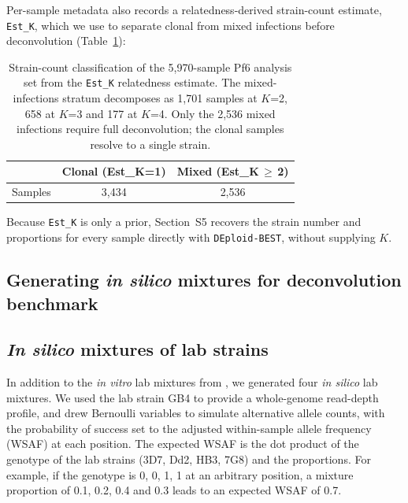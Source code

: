 \documentclass{article}
\begin{document}
Per-sample metadata also records a relatedness-derived strain-count estimate,
\texttt{Est\_K}, which we use to separate clonal from mixed infections before
deconvolution (Table~\ref{tab:pf6}):

\begin{table}[h]
    \centering
    \begin{tabular}{lcc}\hline\hline
                  &  Clonal (Est\_K=1)  & Mixed (Est\_K\,$\geq$\,2) \\ \hline
    Samples &  3,434  & 2,536\\
    \hline\hline
    \end{tabular}
    \caption{Strain-count classification of the 5,970-sample Pf6 analysis set
    from the \texttt{Est\_K} relatedness estimate. The mixed-infections
    stratum decomposes as 1,701 samples at $K$=2, 658 at $K$=3 and 177 at
    $K$=4. Only the 2,536 mixed infections require full deconvolution; the
    clonal samples resolve to a single strain.}
    \label{tab:pf6}
\end{table}

\noindent Because \texttt{Est\_K} is only a prior, Section~S5 recovers the
strain number and proportions for every sample directly with
\texttt{DEploid-BEST}, without supplying $K$.

\subsection{Generating {\it in silico} mixtures for deconvolution benchmark}
\subsection{{\it In silico} mixtures of lab strains}
In addition to the {\it in vitro} lab mixtures from \citet{Wendler2015}, we generated four {\it in silico} lab mixtures. We used the lab strain GB4 to provide a whole-genome read-depth profile, and drew Bernoulli variables to simulate alternative allele counts, with the probability of success set to the adjusted within-sample allele frequency (WSAF) at each position. The expected WSAF is the dot product of the genotype of the lab strains (3D7, Dd2, HB3, 7G8) and the proportions. For example, if the genotype is 0, 0, 1, 1 at an arbitrary position, a mixture proportion of 0.1, 0.2, 0.4 and 0.3 leads to an expected WSAF of 0.7.
\end{document}
